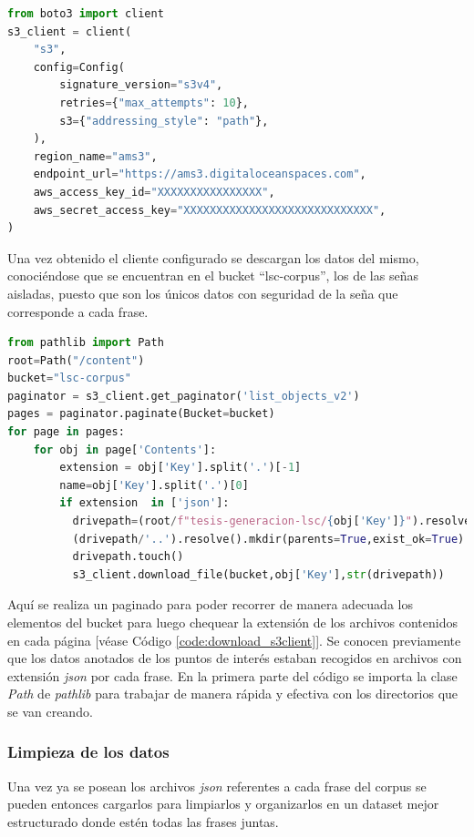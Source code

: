 \vspace{0.5cm}

\begin{lstlisting}[basicstyle=\tiny,language=Python, caption={Instanciar cliente s3}, label={code:s3client}]
from boto3 import client
s3_client = client(
    "s3",
    config=Config(
        signature_version="s3v4",
        retries={"max_attempts": 10},
        s3={"addressing_style": "path"},
    ),
    region_name="ams3",
    endpoint_url="https://ams3.digitaloceanspaces.com",
    aws_access_key_id="XXXXXXXXXXXXXXXX",
    aws_secret_access_key="XXXXXXXXXXXXXXXXXXXXXXXXXXXXX",
)
\end{lstlisting}

Una vez obtenido el cliente configurado se descargan los datos del mismo, conociéndose que se encuentran en el bucket ``lsc-corpus'', los de las señas aisladas, puesto que son los únicos datos con seguridad de la seña que corresponde a cada frase.

\vspace{0.5cm}

\begin{lstlisting}[basicstyle=\tiny,language=Python, caption={Descargar usando el cliente s3}, label={code:download_s3client}]
from pathlib import Path
root=Path("/content")
bucket="lsc-corpus"    
paginator = s3_client.get_paginator('list_objects_v2')
pages = paginator.paginate(Bucket=bucket)
for page in pages:
    for obj in page['Contents']:
        extension = obj['Key'].split('.')[-1]
        name=obj['Key'].split('.')[0]
        if extension  in ['json']:
		  drivepath=(root/f"tesis-generacion-lsc/{obj['Key']}").resolve()
  		  (drivepath/'..').resolve().mkdir(parents=True,exist_ok=True)
  		  drivepath.touch()
  		  s3_client.download_file(bucket,obj['Key'],str(drivepath))
\end{lstlisting}

Aquí se realiza un paginado para poder recorrer de manera adecuada  los elementos del bucket para luego chequear la extensión de los archivos contenidos en cada página [véase Código \ref{code:download_s3client}].
Se conocen previamente que los datos anotados de los puntos de interés estaban recogidos en archivos con extensión \textit{json} por cada frase. En la primera parte del código se importa la clase \textit{Path} de \textit{pathlib} para trabajar de manera rápida y efectiva con los directorios que se van creando.

\subsubsection{Limpieza de los datos}
Una vez ya se posean los archivos \textit{json} referentes a cada frase del corpus se pueden entonces cargarlos para limpiarlos y organizarlos en un dataset mejor estructurado donde estén todas las frases juntas.


